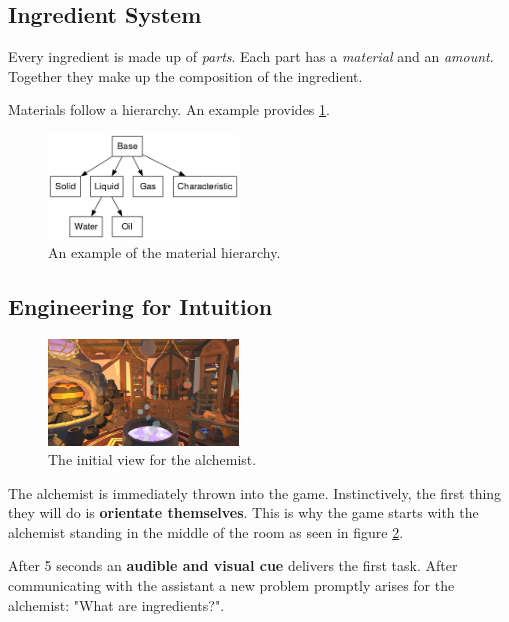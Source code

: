 \documentclass{vgtc}
\begin{document}
\subsection{Ingredient System}

Every ingredient is made up of \emph{parts}. Each part has a \emph{material} and an \emph{amount}. Together they
make up the composition of the ingredient.

Materials follow a hierarchy. An example provides \ref{fig:MaterialHierarchyExample}.

\begin{figure}[ht]
  \centering
  \includegraphics[width=0.45\textwidth]{pictures/test.png}
  \caption{An example of the material hierarchy.}
  \label{fig:MaterialHierarchyExample}
\end{figure}

\subsection{Engineering for Intuition}

\begin{figure}[ht]
  \centering
  \includegraphics[width=0.45\textwidth]{pictures/Screenshot_1.png}
  \caption{The initial view for the alchemist.}
  \label{fig:InitialView}
\end{figure}

The alchemist is immediately thrown into the game. Instinctively, the first thing they will do is
\textbf{orientate themselves}. This is why the game starts with the alchemist standing in the middle of the room as 
seen in figure \ref{fig:InitialView}.

After 5 seconds an \textbf{audible and visual cue} delivers the first task. After communicating with the assistant
a new problem promptly arises for the alchemist: "What are ingredients?".
\end{document}
